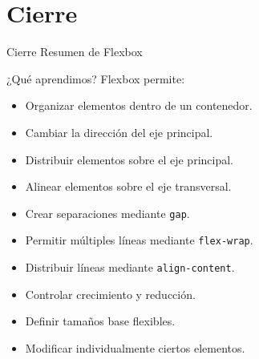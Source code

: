 \documentclass[aspectratio=169,11.5pt]{beamer}
\begin{document}

    \section{Cierre}

    \SectionSlide
    {Cierre}
    {Resumen de Flexbox}

    \begin{frame}{¿Qué aprendimos?}
        Flexbox permite:

        \begin{itemize}
            \item Organizar elementos dentro de un contenedor.
            \item Cambiar la dirección del eje principal.
            \item Distribuir elementos sobre el eje principal.
            \item Alinear elementos sobre el eje transversal.
            \item Crear separaciones mediante \texttt{gap}.
            \item Permitir múltiples líneas mediante \texttt{flex-wrap}.
            \item Distribuir líneas mediante \texttt{align-content}.
            \item Controlar crecimiento y reducción.
            \item Definir tamaños base flexibles.
            \item Modificar individualmente ciertos elementos.
        \end{itemize}
    \end{frame}
\end{document}
